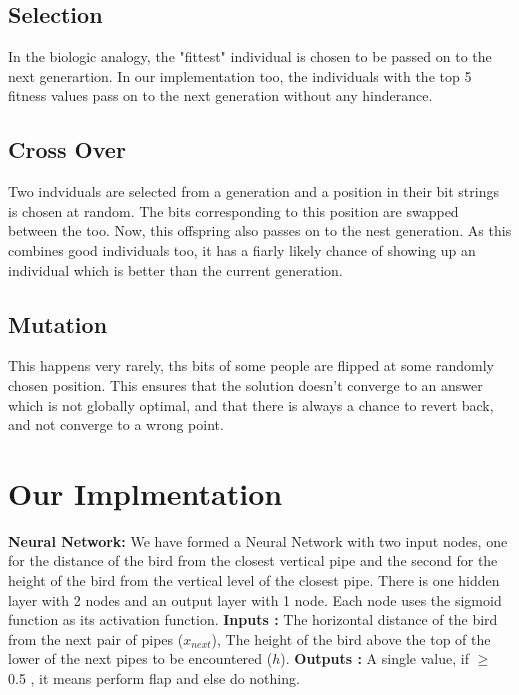 \documentclass{article}
\begin{document}
\subsection{Selection}

In the biologic analogy, the "fittest" individual is chosen to be passed on to the next generartion. In our implementation too, the individuals with the top 5 fitness values pass on to the next generation without any hinderance. 

\subsection{Cross Over}

Two indviduals are selected from a generation and a position in their bit strings is chosen at random. The bits corresponding to this position are swapped between the too. Now, this offspring also passes on to the nest generation. As this combines good individuals too, it has a fiarly likely chance of showing up an individual which is better than the current generation. 

\subsection{Mutation}

This happens very rarely, ths bits of some people are flipped at some randomly chosen position. This ensures that the solution doesn't converge to an answer which is not globally optimal, and that there is always a chance to revert back, and not converge to a wrong point. 

\section{Our Implmentation}

\textbf{Neural Network: }We have formed a Neural Network with two input nodes, one for the distance of the bird from the closest vertical pipe and the second for the height of the bird from the vertical level of the closest pipe. There is one hidden layer with 2 nodes and an output layer with 1 node. Each node uses the sigmoid function as its activation function. \hfill \break
\hfill \break
\textbf{Inputs :} The horizontal distance of the bird from the next pair of pipes ($x_{next}$), The height of the bird above the top of the lower of the next pipes to be encountered ($h$).
\hfill \break \hfill \break
\textbf{Outputs :} A single value, if $\geq$ 0.5 , it means perform flap and else do nothing.
\hfill \break
\hfill \break
\end{document}
